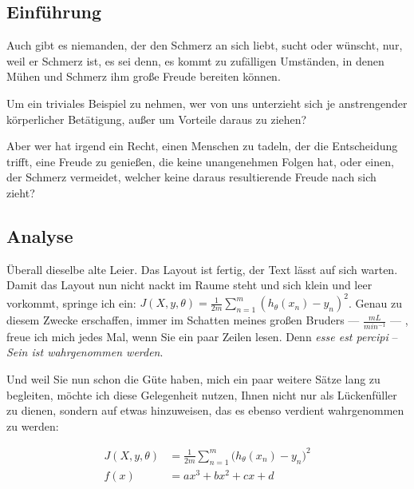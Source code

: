 \hypertarget{einfuxfchrung}{%
\subsection{Einführung}\label{einfuxfchrung}}

Auch gibt es niemanden, der den Schmerz an sich liebt, sucht oder
wünscht, nur, weil er Schmerz ist, es sei denn, es kommt zu
zufälligen Umständen, in denen Mühen und Schmerz ihm große Freude
bereiten können.

Um ein triviales Beispiel zu nehmen, wer von uns unterzieht sich je
anstrengender körperlicher Betätigung, außer um Vorteile daraus zu
ziehen?

Aber wer hat irgend ein Recht, einen Menschen zu tadeln, der die
Entscheidung trifft, eine Freude zu genießen, die keine unangenehmen
Folgen hat, oder einen, der Schmerz vermeidet, welcher keine daraus
resultierende Freude nach sich zieht?

\hypertarget{analyse}{%
\subsection{Analyse}\label{analyse}}

Überall dieselbe alte Leier. Das Layout ist fertig, der Text lässt
auf sich warten. Damit das Layout nun nicht nackt im Raume steht und
sich klein und leer vorkommt, springe ich ein:
\(J(X, y, \theta) = \frac{1}{2m}\sum_{n=1}^m{(h_{\theta}(x_{n})-y_{n})^2}\).
Genau zu diesem Zwecke erschaffen, immer im Schatten meines großen
Bruders --- \(\frac{mL}{min^{-1}}\) --- , freue ich mich jedes Mal,
wenn Sie ein paar Zeilen lesen. Denn \emph{esse est percipi} --
\emph{Sein ist wahrgenommen werden}.

Und weil Sie nun schon die Güte haben, mich ein paar weitere Sätze
lang zu begleiten, möchte ich diese Gelegenheit nutzen, Ihnen nicht
nur als Lückenfüller zu dienen, sondern auf etwas hinzuweisen, das
es ebenso verdient wahrgenommen zu werden:

\begin{equation}
\begin{aligned}
  J(X, y, \theta) &= \frac{1}{2m}\sum_{n=1}^m{\big(h_{\theta}(x_{n})-y_{n}\big)^2} \\
  f(x) &= ax^3 + bx^2 + cx + d
\end{aligned}
\end{equation}

